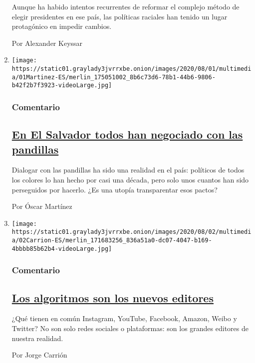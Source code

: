 \begin{enumerate}
  Aunque ha habido intentos recurrentes de reformar el complejo método
  de elegir presidentes en ese país, las políticas raciales han tenido
  un lugar protagónico en impedir cambios.

  Por Alexander Keyssar
\item
  \texttt{[image: https://static01.graylady3jvrrxbe.onion/images/2020/08/01/multimedia/01Martinez-ES/merlin\_175051002\_8b6c73d6-78b1-44b6-9806-b42f2b7f3923-videoLarge.jpg]}

  \hypertarget{comentario-2}{%
  \subsubsection{Comentario}\label{comentario-2}}

  \hypertarget{en-el-salvador-todos-han-negociado-con-las-pandillas}{%
  \subsection{\texorpdfstring{\href{/es/2020/08/02/espanol/opinion/pandillas-el-salvador.html}{En
  El Salvador todos han negociado con las
  pandillas}}{En El Salvador todos han negociado con las pandillas}}\label{en-el-salvador-todos-han-negociado-con-las-pandillas}}

  Dialogar con las pandillas ha sido una realidad en el país: políticos
  de todos los colores lo han hecho por casi una década, pero solo unos
  cuantos han sido perseguidos por hacerlo. ¿Es una utopía transparentar
  esos pactos?

  Por Óscar Martínez
\item
  \texttt{[image: https://static01.graylady3jvrrxbe.onion/images/2020/08/02/multimedia/02Carrion-ES/merlin\_171683256\_836a51a0-dc07-4047-b169-4bbbb85b62b4-videoLarge.jpg]}

  \hypertarget{comentario-3}{%
  \subsubsection{Comentario}\label{comentario-3}}

  \hypertarget{los-algoritmos-son-los-nuevos-editores}{%
  \subsection{\texorpdfstring{\href{/es/2020/08/02/espanol/opinion/facebook-amazon-instagram.html}{Los
  algoritmos son los nuevos
  editores}}{Los algoritmos son los nuevos editores}}\label{los-algoritmos-son-los-nuevos-editores}}

  ¿Qué tienen en común Instagram, YouTube, Facebook, Amazon, Weibo y
  Twitter? No son solo redes sociales o plataformas: son los grandes
  editores de nuestra realidad.

  Por Jorge Carrión
\end{enumerate}

